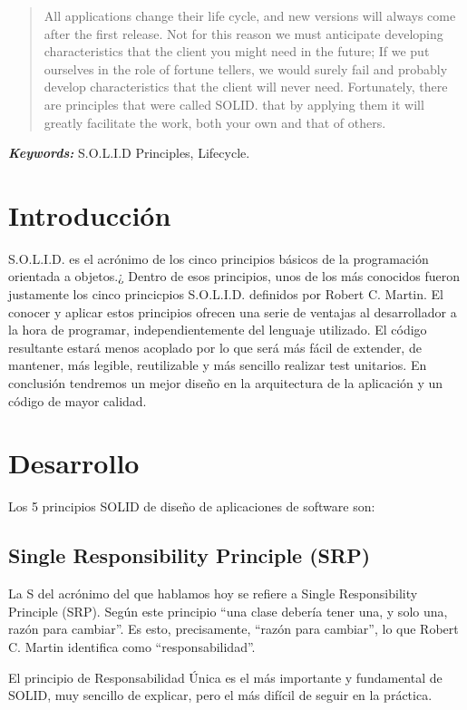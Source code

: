 \documentclass[12pt,letterpaper]{article}
\providecommand{\keywords}[1]
{
  \small	
  \textbf{\textit{Keywords: }} #1
}
\begin{document}
\begin{abstract}
    All applications change their life cycle, and new versions will always come after the first release. Not for this reason we must anticipate developing characteristics that the client
    you might need in the future; If we put ourselves in the role of fortune tellers, we would surely fail and probably develop characteristics that the client will never need. Fortunately, there are principles that were called
    SOLID. that by applying them it will greatly facilitate the work, both your own and that of others.
\end{abstract}
\keywords{S.O.L.I.D Principles, Lifecycle.}



\section{Introducción}

S.O.L.I.D. es el acrónimo de los cinco principios básicos de la programación orientada a objetos.¿
Dentro de esos principios, unos de los más conocidos fueron justamente los cinco princicpios S.O.L.I.D. definidos por Robert C. Martin. El conocer y aplicar estos principios ofrecen una serie de ventajas al desarrollador a la hora de programar, independientemente del lenguaje utilizado. El código resultante estará menos acoplado por lo que será más fácil de extender, de mantener, más legible, reutilizable y más sencillo realizar test unitarios. En conclusión tendremos un mejor diseño en la arquitectura de la aplicación y un código de mayor calidad.
\section{Desarrollo}


Los 5 principios SOLID de diseño de aplicaciones de software son:


\subsection{Single Responsibility Principle (SRP)}

La S del acrónimo del que hablamos hoy se refiere a Single Responsibility Principle (SRP). Según este principio “una clase debería tener una, y solo una, razón para cambiar”. Es esto, precisamente,
 “razón para cambiar”, lo que Robert C. Martin identifica como “responsabilidad”.


El principio de Responsabilidad Única es el más importante y fundamental de SOLID, muy sencillo de explicar, pero el más difícil de seguir en la práctica.
\end{document}
